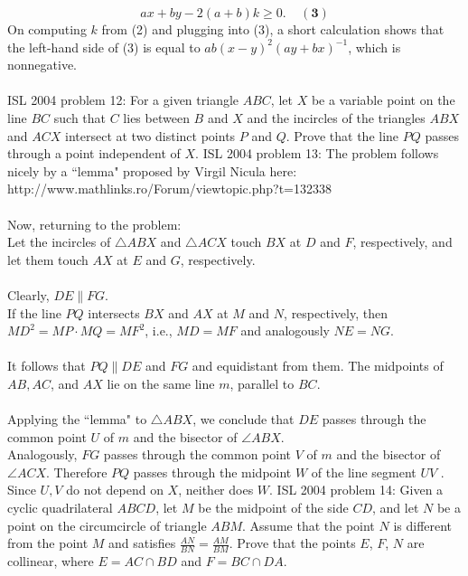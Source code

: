 \[ ax+by-2(a+b)k\geq 0.\ \ \ \ \ \mathbf{(3)} \]
On computing $k$ from (2) and plugging into (3), a short calculation shows that the left-hand side of (3) is equal to ${ab(x-y)^2(ay+bx)^{-1}}$, which is nonnegative. \\\\
[Moderator edit: This is the second proposed solution of this problem, avaliable at http://www.mathlinks.ro/Forum/viewtopic.php?t=15622 .] 
ISL 2004 problem 12:  For a given triangle $ ABC$, let $ X$ be a variable point on the line $ BC$ such that $ C$ lies between $ B$ and $ X$ and the incircles of the triangles $ ABX$ and $ ACX$ intersect at two distinct points $ P$ and $ Q.$ Prove that the line $ PQ$  passes through a point independent of $ X$. 
ISL 2004 problem 13:  The problem follows nicely by a ``lemma" proposed by Virgil Nicula here: http://www.mathlinks.ro/Forum/viewtopic.php?t=132338 \\\\
Now, returning to the problem: \\
Let the incircles of $\triangle{ABX}$ and $\triangle{ACX}$ touch $BX$ at $D$ and $F$, respectively, and let them touch $AX$ at $E$ and $G$, respectively. \\\\
Clearly, $DE \| FG$. \\
If the line $PQ$ intersects $BX$ and $AX$ at $M$ and $N$, respectively, then $MD^2= MP\cdot MQ = MF^2$, i.e., $MD = MF$ and analogously $NE = NG$. \\\\
It follows that $PQ \| DE$ and $FG$ and equidistant from them. The midpoints of $AB, AC$, and $AX$ lie on the same line $m$, parallel to $BC$. \\\\
Applying the ``lemma" to $\triangle{ABX}$, we conclude that $DE$ passes through the common point  $U$ of $m$ and the bisector of $\angle{ABX}$. \\
Analogously, $FG$ passes through the common point $V$ of $m$ and the bisector of $\angle{ACX}$. Therefore $PQ$ passes through the midpoint $W$ of the line segment $UV$ . Since $U, V$ do not depend on $X$, neither does $W$. 
ISL 2004 problem 14:  Given a cyclic quadrilateral $ABCD$, let $M$ be the midpoint of the side $CD$, and let $N$ be a point on the circumcircle of triangle $ABM$. Assume that the point $N$ is different from the point $M$ and satisfies $\frac{AN}{BN}=\frac{AM}{BM}$. Prove that the points $E$, $F$, $N$ are collinear, where $E=AC\cap BD$ and $F=BC\cap DA$. \\\\

